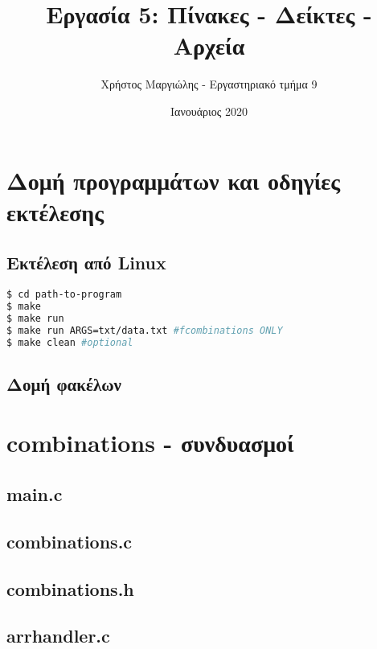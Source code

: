 \documentclass{article}
\title{Εργασία 5: Πίνακες - Δείκτες - Αρχεία}
\author{Χρήστος Μαργιώλης - Εργαστηριακό τμήμα 9}
\date{Ιανουάριος 2020}
\begin{document}
\begin{titlepage}
    \maketitle
\end{titlepage}

\renewcommand{\contentsname}{Περιεχόμενα}
\tableofcontents

\section{Δομή προγραμμάτων και οδηγίες εκτέλεσης}

    \subsection{Εκτέλεση από Linux}
\begin{lstlisting}[language=bash]
$ cd path-to-program
$ make
$ make run
$ make run ARGS=txt/data.txt #fcombinations ONLY
$ make clean #optional
\end{lstlisting}

    \subsection{Δομή φακέλων}


\section{combinations - συνδυασμοί}

    \subsection{main.c}
        

    \subsection{combinations.c}
        

    \subsection{combinations.h}
        

    \subsection{arrhandler.c}
        
\end{document}
